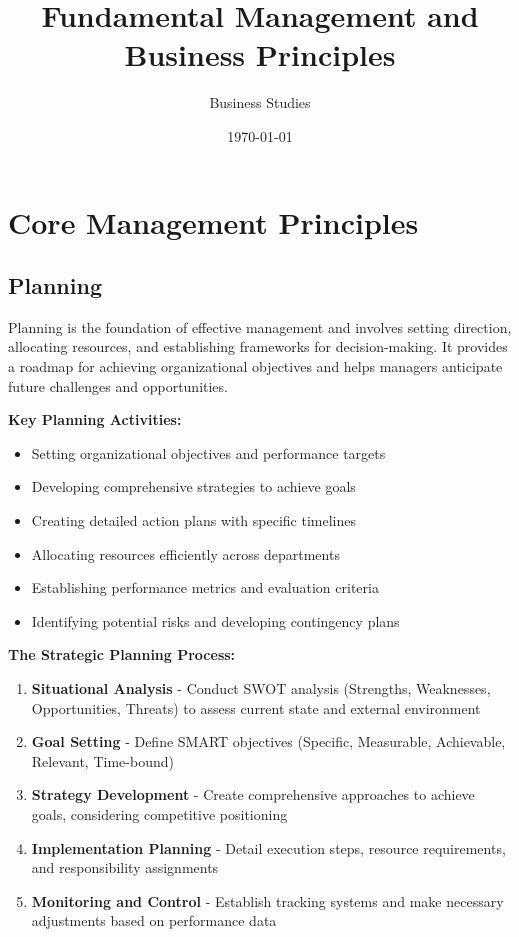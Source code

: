 \documentclass[12pt]{article}
\title{Fundamental Management and Business Principles}
\author{Business Studies}
\date{\today}
\begin{document}
\maketitle

\section{Core Management Principles}

\subsection{Planning}
Planning is the foundation of effective management and involves setting direction, allocating resources, and establishing frameworks for decision-making. It provides a roadmap for achieving organizational objectives and helps managers anticipate future challenges and opportunities.

\textbf{Key Planning Activities:}
\begin{itemize}
    \item Setting organizational objectives and performance targets
    \item Developing comprehensive strategies to achieve goals
    \item Creating detailed action plans with specific timelines
    \item Allocating resources efficiently across departments
    \item Establishing performance metrics and evaluation criteria
    \item Identifying potential risks and developing contingency plans
\end{itemize}

\textbf{The Strategic Planning Process:}
\begin{enumerate}
    \item \textbf{Situational Analysis} - Conduct SWOT analysis (Strengths, Weaknesses, Opportunities, Threats) to assess current state and external environment
    \item \textbf{Goal Setting} - Define SMART objectives (Specific, Measurable, Achievable, Relevant, Time-bound)
    \item \textbf{Strategy Development} - Create comprehensive approaches to achieve goals, considering competitive positioning
    \item \textbf{Implementation Planning} - Detail execution steps, resource requirements, and responsibility assignments
    \item \textbf{Monitoring and Control} - Establish tracking systems and make necessary adjustments based on performance data
\end{enumerate}
\end{document}
